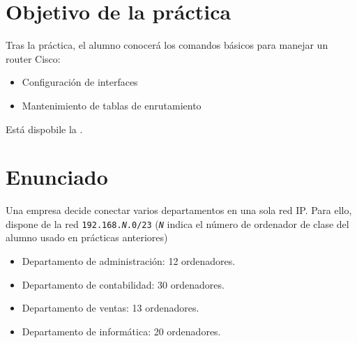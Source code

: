 
\usepackage{eurosym}
\usepackage{needspace}


\renewcommand{\hmwkTitle}{Práctica enrutamiento IP}
\renewcommand{\hmwkClass}{Planificación y Administración de Redes}

\usepackage{blindtext}






\primerapagina

\setlength{\parindent}{1em}
\setlength{\parskip}{1em}

\section{Objetivo de la práctica}
Tras la práctica, el alumno conocerá los comandos básicos para manejar un router Cisco:
\begin{itemize}
\item Configuración de interfaces
\item Mantenimiento de tablas de enrutamiento
\end{itemize}

Está dispobile la .

\section{Enunciado}
Una empresa decide conectar varios departamentos en una sola red IP. Para ello, dispone de la red \texttt{192.168.\textit{N}.0/23} (\texttt{\textit{N}} indica el número de ordenador de clase del alumno usado en prácticas anteriores)
\begin{itemize}
\item Departamento de administración: 12 ordenadores.
\item Departamento de contabilidad: 30 ordenadores.
\item Departamento de ventas: 13 ordenadores.
\item Departamento de informática: 20 ordenadores.
\end{itemize}

